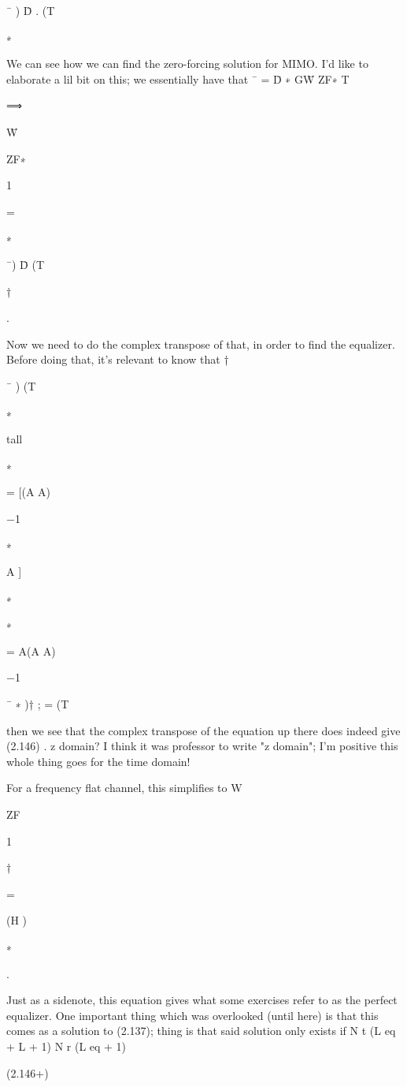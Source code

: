 {¯ ) D̄ .
(T

\sqrtG

∗

We can see how we can find the zero-forcing solution for MIMO.
I'd like to elaborate a lil bit on this; we essentially have that
¯ = D̄ ∗
\sqrt GW̄ ZF∗ T

⟹

W̄

ZF∗

1

=

\sqrtG

∗

¯)
D̄ (T

†

.

Now we need to do the complex transpose of that, in order to find the equalizer.
Before doing that, it's relevant to know that
†

¯ )
(T

∗

tall

∗

= [(A A)

−1

∗

A ]

∗

∗

= A(A A)

−1

¯ ∗ )† ;
= (T

then we see that the complex transpose of the equation up there does indeed give (2.146)
.
​z domain?
I think it was professor to write "z domain"; I'm positive this whole thing goes for the time domain!

For a frequency flat channel, this simplifies to W

ZF

1

†

=

(H )

∗

.

\sqrtG

Just as a sidenote, this equation gives what some exercises refer to as the perfect equalizer.
One important thing which was overlooked (until here) is that this comes as a solution to
(2.137); thing is that said solution only exists if N t (L eq + L + 1) \leq N r (L eq + 1)

(2.146+)

}
